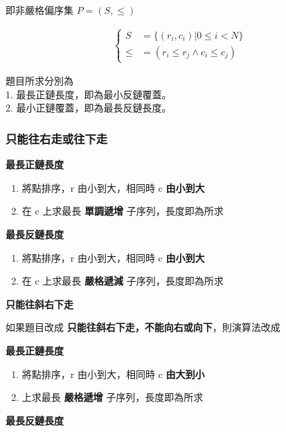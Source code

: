\documentclass[10pt,oneside]{article}
\begin{document}
\begin{landscape}
\begin{multicols}{2}
{\noindent 即非嚴格偏序集 $P = (S, \le)$

\begin{equation}
\begin{split}
\begin{cases}
    	S &= \{ (r_i, c_i) | 0 \le i < N \} \\
    	\le &= (r_i \le r_j \land c_i \le c_j)
\end{cases}
\end{split}
\end{equation}

\noindent 題目所求分別為\\
1. 最長正鏈長度，即為最小反鏈覆蓋。\\
2. 最小正鏈覆蓋，即為最長反鏈長度。
}

\subsubsection{只能往右走或往下走}

{\normalsize
\textbf{最長正鏈長度}

\begin{enumerate}
	\item 將點排序，r 由小到大，相同時 c \textbf{由小到大}
	\item 在 c 上求最長 \textbf{單調遞增} 子序列，長度即為所求
\end{enumerate}
}

{\normalsize
\noindent \textbf{最長反鏈長度}

\begin{enumerate}
	\item 將點排序，r 由小到大，相同時 c \textbf{由小到大}
	\item 在 c 上求最長 \textbf{嚴格遞減} 子序列，長度即為所求
\end{enumerate}
}

{\normalsize
\noindent  \textbf{只能往斜右下走}

如果題目改成 \textbf{只能往斜右下走，不能向右或向下}，則演算法改成
}

{\normalsize
\noindent  \textbf{最長正鏈長度}

\begin{enumerate}
	\item 將點排序，r 由小到大，相同時 c \textbf{由大到小}
	\item 上求最長 \textbf{嚴格遞增} 子序列，長度即為所求
\end{enumerate}
}

{\normalsize
\noindent \textbf{最長反鏈長度}

}
\end{multicols}
\end{landscape}
\end{document}
